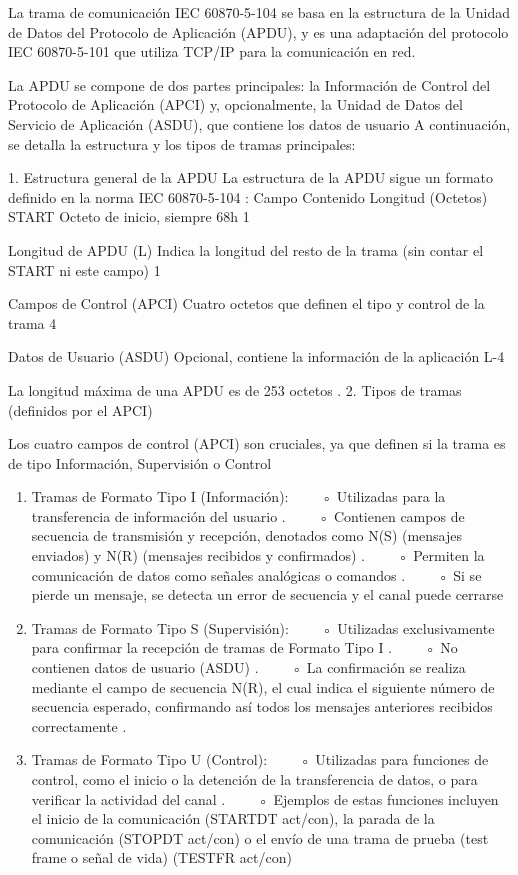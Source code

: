 \documentclass[a5paper]{book}%
\begin{document}
La trama de comunicación IEC 60870-5-104 se basa en la estructura de la Unidad de Datos del Protocolo de Aplicación (APDU), y es una adaptación del protocolo IEC 60870-5-101 que utiliza TCP/IP para la comunicación en red.

La APDU se compone de dos partes principales: la Información de Control del Protocolo de Aplicación (APCI) y, opcionalmente, la Unidad de Datos del Servicio de Aplicación (ASDU), que contiene los datos de usuario
A continuación, se detalla la estructura y los tipos de tramas principales:

1. Estructura general de la APDU
La estructura de la APDU sigue un formato definido en la norma IEC 60870-5-104
:
Campo	Contenido	Longitud (Octetos)
START	Octeto de inicio, siempre 68h	1
		
Longitud de APDU (L)	Indica la longitud del resto de la trama (sin contar el START ni este campo)	1
		
Campos de Control (APCI)	Cuatro octetos que definen el tipo y control de la trama	4
		
Datos de Usuario (ASDU)	Opcional, contiene la información de la aplicación	L-4

La longitud máxima de una APDU es de 253 octetos
.
2. Tipos de tramas (definidos por el APCI)


Los cuatro campos de control (APCI) son cruciales, ya que definen si la trama es de tipo Información, Supervisión o Control

\begin{enumerate}
\item Tramas de Formato Tipo I (Información):
    ◦ Utilizadas para la transferencia de información del usuario
.
    ◦ Contienen campos de secuencia de transmisión y recepción, denotados como N(S) (mensajes enviados) y N(R) (mensajes recibidos y confirmados)
.
    ◦ Permiten la comunicación de datos como señales analógicas o comandos
.
    ◦ Si se pierde un mensaje, se detecta un error de secuencia y el canal puede cerrarse

\item Tramas de Formato Tipo S (Supervisión):
    ◦ Utilizadas exclusivamente para confirmar la recepción de tramas de Formato Tipo I
.
    ◦ No contienen datos de usuario (ASDU)
.
    ◦ La confirmación se realiza mediante el campo de secuencia N(R), el cual indica el siguiente número de secuencia esperado, confirmando así todos los mensajes anteriores recibidos correctamente
.
\item Tramas de Formato Tipo U (Control):
    ◦ Utilizadas para funciones de control, como el inicio o la detención de la transferencia de datos, o para verificar la actividad del canal
.
    ◦ Ejemplos de estas funciones incluyen el inicio de la comunicación (STARTDT act/con), la parada de la comunicación (STOPDT act/con) o el envío de una trama de prueba (test frame o señal de vida) (TESTFR act/con)
\end{enumerate}
\end{document}

